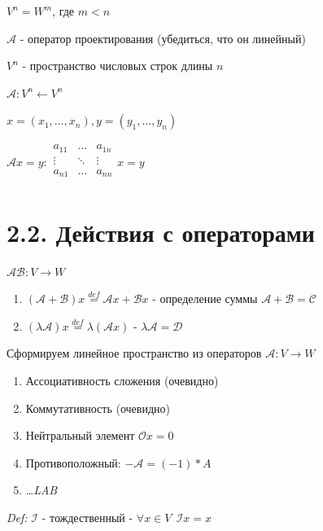 \documentclass[12pt]{article}
\begin{document}
     $V^n = W^m$, где $m < n$

    $\mathcal{A}$ - оператор проектирования (убедиться, что он линейный)

     $V^n$ - пространство числовых строк длины $n$

    $\mathcal{A}: V^n \leftarrow V^n$

    $x = (x_1, \dots, x_n), y = (y_1, \dots, y_n)$

    $\mathcal{A}x = y : \begin{array}{|ccc|}
    a_{11} & \ldots & a_{1n}\\
    \vdots & \ddots & \vdots\\
    a_{n1} & \ldots & a_{nn}\\
    \end{array}x = y$


    \section{2.2. Действия с операторами}

    \Def $\mathcal{A}\mathcal{B}: V \rightarrow W$

    \begin{enumerate}
        \item $(\mathcal{A} + \mathcal{B})x \stackrel{def}{=} \mathcal{A}x + \mathcal{B}x$ - определение суммы $\mathcal{A} + \mathcal{B} = \mathcal{C}$
        \item $(\lambda\mathcal{A})x \stackrel{def}{=} \lambda(\mathcal{A}x)$ - $\lambda\mathcal{A} = \mathcal{D}$
    \end{enumerate}

    \Nota Сформируем линейное пространство из операторов $\mathcal{A}: V \rightarrow W$

    \begin{enumerate}
        \item Ассоциативность сложения (очевидно)
        \item Коммутативность (очевидно)
        \item Нейтральный элемент $\mathcal{O}x = 0$
        \item Противоположный: $-\mathcal{A} = (-1) * A$
        \item \dots \textit{LAB}
    \end{enumerate}

    \textit{Def:} $\mathcal{I}$ - тождественный - $\forall x \in V \ \ \mathcal{I}x = x$
\end{document}
